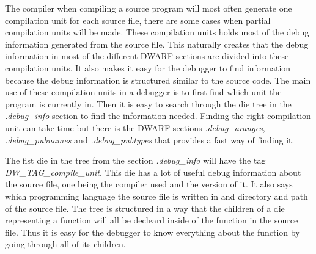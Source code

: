 


The compiler when compiling a source program will most often generate one compilation unit for each source file, there are some cases when partial compilation units will be made.
These compilation units holds most of the debug information generated from the source file.
This naturally creates that the debug information in most  of the different \gls{DWARF} sections are divided into these compilation units.
It also makes it easy for the debugger to find information because the debug information is structured similar to the source code.
The main use of these compilation units in a debugger is to first find which unit the program is currently in.
Then it is easy to search through the \gls{die} \gls{tree} in the \emph{.debug\_info} section to find the information needed. 
Finding the right compilation unit can take time but there is the \gls{DWARF} sections \emph{.debug\_aranges}, \emph{.debug\_pubnames} and \emph{.debug\_pubtypes} that provides a fast way of finding it.

The fist \gls{die} in the \gls{tree} from the section \emph{.debug\_info} will have the tag \emph{DW\_TAG\_compile\_unit}.
This \gls{die} has a lot of useful debug information about the source file, one being the compiler used and the version of it.
It also says which programming language the source file is written in and directory and path of the source file.
The \gls{tree} is structured in a way that the children of a \gls{die} representing a function will all be decleard inside of the function in the source file.
Thus it is easy for the debugger to know everything about the function by going through all of its children.

